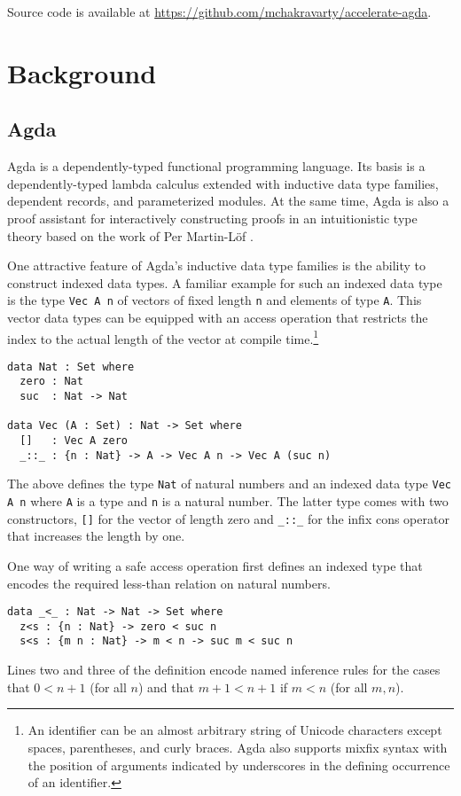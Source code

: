 \documentclass{llncs}
\begin{document}
\noindent
Source code is available at \url{https://github.com/mchakravarty/accelerate-agda}.

\section{Background}
\label{sec:background}

\subsection{Agda}
\label{sec:agda}

Agda \cite{Norell2008,BoveDybjerNorell2009} is a dependently-typed
functional programming language. Its basis is a dependently-typed
lambda calculus extended with inductive data type families, dependent
records, and parameterized modules. At the same time, Agda is also a
proof assistant for interactively constructing proofs in an
intuitionistic type theory based on the work of Per Martin-L\"of
\cite{MartinLoef1984}. 

One attractive feature of Agda's inductive data type families is the
ability to construct indexed data types.
A familiar example for such an indexed data type is the type
\verb+Vec A n+ of vectors of fixed length \verb+n+ and elements of
type \verb+A+. This vector data types can be equipped with an access
operation that restricts the index to the 
actual length of the vector at compile time.\footnote{An
  identifier can be an almost arbitrary 
  string of Unicode characters except spaces, parentheses, and curly
  braces. Agda also supports mixfix syntax with the position of
  arguments indicated by underscores in the defining occurrence of an
  identifier.} 
\begin{verbatim}
data Nat : Set where
  zero : Nat
  suc  : Nat -> Nat

data Vec (A : Set) : Nat -> Set where
  []   : Vec A zero
  _::_ : {n : Nat} -> A -> Vec A n -> Vec A (suc n)
\end{verbatim}
The above defines the type \verb+Nat+ of natural numbers and an
indexed data type \verb+Vec A n+ where \texttt{A} is a type and
\texttt{n} is a natural number. The latter type comes with two 
constructors, \verb+[]+ for the vector of length zero and 
\verb+_::_+ for the infix cons operator that increases the length by one.

One way of writing a safe access operation first defines an indexed
type that encodes the required less-than relation on natural numbers.
\begin{verbatim}
data _<_ : Nat -> Nat -> Set where
  z<s : {n : Nat} -> zero < suc n
  s<s : {m n : Nat} -> m < n -> suc m < suc n
\end{verbatim}
Lines two and three of the definition encode named inference rules for
the cases that $0 < n+1$ (for all $n$) and that $m+1 < n+1$ if $m < n$
(for all $m,n$).
\end{document}
